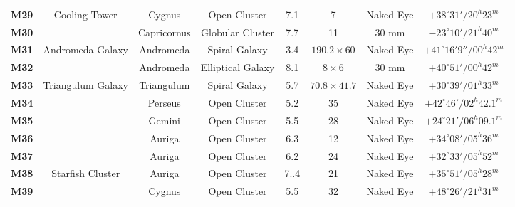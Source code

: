 \documentclass[a4paper,12pt]{extarticle}
\begin{document}
\begin{table}[H]
\begin{tabular}{cccccccc}
\textbf{M29} &    Cooling Tower                                                                & Cygnus      & Open Cluster      & 7.1 & 7     & Naked Eye & $+38^\circ 31'/ 20^h 23^m$           \\
\rowcolor[HTML]{FFF2CC} 
\textbf{M30} &                                                                    & Capricornus & Globular Cluster  & 7.7 & 11    & 30 mm     & $-23^\circ 10'/ 21^h 40^m$           \\
\rowcolor[HTML]{00FFFF} 
\textbf{M31} & \multicolumn{1}{c}{\cellcolor[HTML]{00FFFF}Andromeda Galaxy}       & Andromeda   & Spiral Galaxy     & 3.4 & $190.2\times 60$ & Naked Eye & $+41^\circ 16'9''/ 00^h 42^m$ \\
\rowcolor[HTML]{F3F3F3} 
\textbf{M32} &                                                                    & Andromeda   & Elliptical Galaxy & 8.1 & $8\times6$    & 30 mm     & $+40^\circ51'/ 00^h 42^m$            \\
\rowcolor[HTML]{00FFFF} 
\textbf{M33} & \multicolumn{1}{c}{\cellcolor[HTML]{00FFFF}Triangulum Galaxy}      & Triangulum  & Spiral Galaxy     & 5.7 & $70.8\times 41.7$  & Naked Eye & $+30^\circ 39'/ 01^h 33^m$           \\
\rowcolor[HTML]{D9EAD3} 
\textbf{M34} &                                                                    & Perseus     & Open Cluster      & 5.2 & 35    & Naked Eye & $+42^\circ 46'/ 02^h 42.1^m$         \\
\rowcolor[HTML]{D9EAD3} 
\textbf{M35} &                                                                    & Gemini      & Open Cluster      & 5.5 & 28    & Naked Eye & $+24^\circ 21'/ 06^h 09.1^m$         \\
\rowcolor[HTML]{D9EAD3} 
\textbf{M36} &                                                                    & Auriga      & Open Cluster      & 6.3   & 12    & Naked Eye & $+34^\circ 08'/ 05^h 36^m$           \\
\rowcolor[HTML]{D9EAD3} 
\textbf{M37} &                                                                    & Auriga      & Open Cluster      & 6.2 & 24    & Naked Eye & $+32^\circ 33'/ 05^h 52^m$           \\
\rowcolor[HTML]{D9EAD3} 
\textbf{M38} &     Starfish Cluster                                                               & Auriga      & Open Cluster      & 7..4 & 21    & Naked Eye & $+35^\circ 51'/ 05^h 28^m $          \\
\rowcolor[HTML]{D9EAD3} 
\textbf{M39} &                                                                    & Cygnus      & Open Cluster      & 5.5 & 32    & Naked Eye & $+48^\circ 26'/ 21^h 31^m$           \\

\end{tabular}
\end{table}
\end{document}
